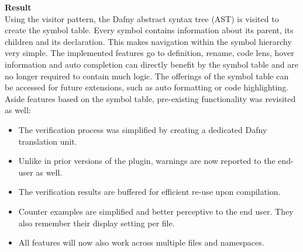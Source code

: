 \textbf{Result}\\
Using the visitor pattern, the Dafny abstract syntax tree (AST) is visited to create the symbol table.
Every symbol contains information about its parent, its children and its declaration.
This makes navigation within the symbol hierarchy very simple.
The implemented features go to definition, rename, code lens, hover information and auto completion can directly benefit by the symbol table and are no longer required to contain much logic.
The offerings of the symbol table can be accessed for future extensions, such as auto formatting or code highlighting.\\


Aside features based on the symbol table, pre-existing functionality was revisited as well:
\begin{itemize}
    \item The verification process was simplified by creating a dedicated Dafny translation unit.
    \item Unlike in prior versions of the plugin, warnings are now reported to the end-user as well.
    \item The verification results are buffered for efficient re-use upon compilation.
    \item Counter examples are simplified and better perceptive to the end user. They also remember their display setting per file.
    \item All features will now also work across multiple files and namespaces.
\end{itemize}

